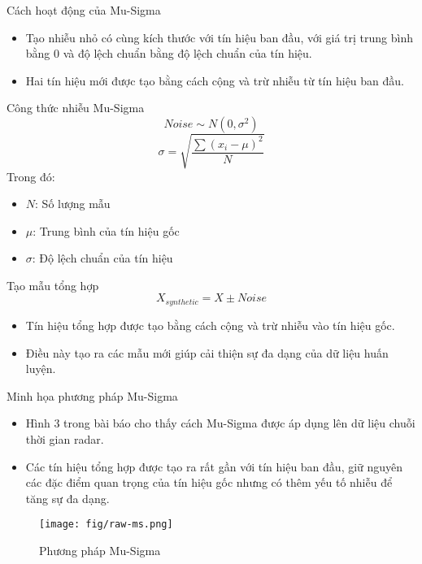 \documentclass{beamer}
\begin{document}
\begin{frame}{Cách hoạt động của Mu-Sigma}
    \begin{itemize}
        \item Tạo nhiễu nhỏ có cùng kích thước với tín hiệu ban đầu, với giá trị trung bình bằng 0 và độ lệch chuẩn bằng độ lệch chuẩn của tín hiệu.
        \item Hai tín hiệu mới được tạo bằng cách cộng và trừ nhiễu từ tín hiệu ban đầu.
    \end{itemize}
\end{frame}

\begin{frame}{Công thức nhiễu Mu-Sigma}
    \begin{equation}
    Noise \sim N(0, \sigma^2)
    \end{equation}
    \begin{equation}
    \sigma = \sqrt{\frac{\sum(x_i - \mu)^2}{N}}
    \end{equation}
    Trong đó:
    \begin{itemize}
        \item $N$: Số lượng mẫu
        \item $\mu$: Trung bình của tín hiệu gốc
        \item $\sigma$: Độ lệch chuẩn của tín hiệu
    \end{itemize}
\end{frame}

\begin{frame}{Tạo mẫu tổng hợp}
    \begin{equation}
    X_{synthetic} = X \pm Noise
    \end{equation}
    \begin{itemize}
        \item Tín hiệu tổng hợp được tạo bằng cách cộng và trừ nhiễu vào tín hiệu gốc.
        \item Điều này tạo ra các mẫu mới giúp cải thiện sự đa dạng của dữ liệu huấn luyện.
    \end{itemize}
\end{frame}

\begin{frame}{Minh họa phương pháp Mu-Sigma}
    \begin{itemize}
        \item Hình 3 trong bài báo cho thấy cách Mu-Sigma được áp dụng lên dữ liệu chuỗi thời gian radar.
        \item Các tín hiệu tổng hợp được tạo ra rất gần với tín hiệu ban đầu, giữ nguyên các đặc điểm quan trọng của tín hiệu gốc nhưng có thêm yếu tố nhiễu để tăng sự đa dạng.
    \end{itemize}
    \begin{figure}
        \centering
        \texttt{[image: fig/raw-ms.png]}
        \caption{Phương pháp Mu-Sigma}
        \label{fig:lstm}
    \end{figure}
\end{frame}
\end{document}
